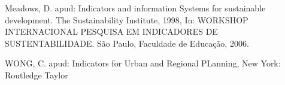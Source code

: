 \documentclass[
12pt,		%
openright,	%
twoside,  %
a4paper,			%
chapter=TITLE,		%
english,			%
french,				%
spanish,			%
brazil				%
]{USPSC-classe/USPSC_RedarTex}
\begin{document}
\begin{flushleft}
\begin{flushleft}
\begin{flushleft}
\begin{flushleft}
\begin{flushleft}
\begin{flushleft}
\begin{flushleft}
\begin{flushleft}
[MEADOWS, 2006] Meadows, D. apud: Indicators and information Systems for sustainable development. The Sustainability Institute, 1998, In: WORKSHOP INTERNACIONAL PESQUISA EM INDICADORES DE SUSTENTABILIDADE. S\~ao Paulo, Faculdade de Educa\c{c}\~ao, 2006.
\end{flushleft}


\end{flushleft}


\end{flushleft}


\end{flushleft}


\end{flushleft}


\end{flushleft}


\end{flushleft}


\end{flushleft}


\begin{flushleft}
\begin{flushleft}
\begin{flushleft}
\begin{flushleft}
\begin{flushleft}
\begin{flushleft}
\begin{flushleft}
\begin{flushleft}
[WONG, 2006] WONG, C. apud: Indicators for Urban and Regional PLanning, New York: Routledge Taylor 
\end{flushleft}


\end{flushleft}


\end{flushleft}


\end{flushleft}


\end{flushleft}


\end{flushleft}


\end{flushleft}


\end{flushleft}
\end{document}
